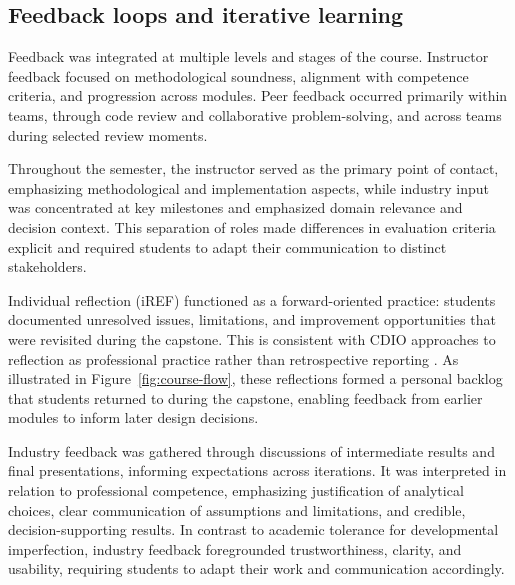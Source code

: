 \subsection{Feedback loops and iterative learning}

Feedback was integrated at multiple levels and stages of the course. Instructor feedback focused on methodological soundness, alignment with competence criteria, and progression across modules. Peer feedback occurred primarily within teams, through code review and collaborative problem-solving, and across teams during selected review moments.

Throughout the semester, the instructor served as the primary point of contact, emphasizing methodological and implementation aspects, while industry input was concentrated at key milestones and emphasized domain relevance and decision context. This separation of roles made differences in evaluation criteria explicit and required students to adapt their communication to distinct stakeholders.

Individual reflection (iREF) functioned as a forward-oriented practice: students documented unresolved issues, limitations, and improvement opportunities that were revisited during the capstone. This is consistent with CDIO approaches to reflection as professional practice rather than retrospective reporting \parencite{junaid2018logbook}. As illustrated in Figure~\ref{fig:course-flow}, these reflections formed a personal backlog that students returned to during the capstone, enabling feedback from earlier modules to inform later design decisions.

Industry feedback was gathered through discussions of intermediate results and final presentations, informing expectations across iterations. It was interpreted in relation to professional competence, emphasizing justification of analytical choices, clear communication of assumptions and limitations, and credible, decision-supporting results. In contrast to academic tolerance for developmental imperfection, industry feedback foregrounded trustworthiness, clarity, and usability, requiring students to adapt their work and communication accordingly. %

